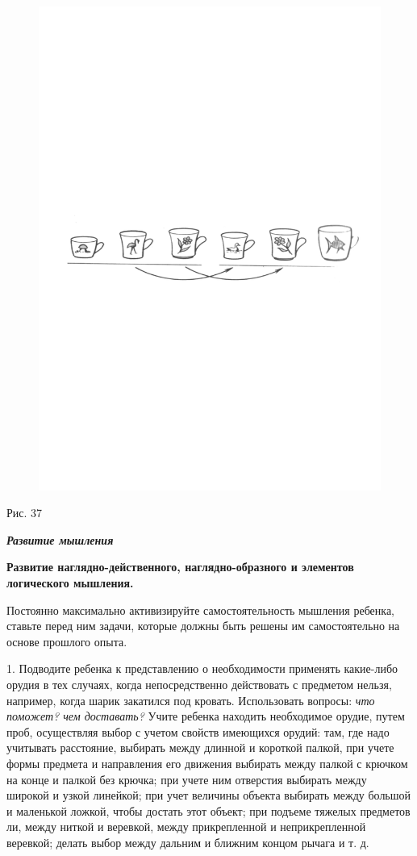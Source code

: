 \documentclass[a5paper]{book}
\renewcommand{\emph}[1]{\textit{#1}}
\begin{document}
\begin{figure}
\centering
\includegraphics[width=\linewidth]{media/media/image34.png}
\end{figure}

Рис. 37

\emph{\textbf{Развитие мышления}}

\textbf{Развитие наглядно-действенного, наглядно-образного и элементов
логического мышления.}

Постоянно максимально активизируйте самостоятельность мышления ребенка,
ставьте перед ним задачи, которые должны быть решены им самостоятельно
на основе прошлого опыта.

1. Подводите ребенка к представлению о необходимости применять
какие-либо орудия в тех случаях, когда непосредственно действовать с
предметом нельзя, например, когда шарик закатился под кровать.
Использовать вопросы: \emph{что поможет? чем доставать?} Учите ребенка
находить необходимое орудие, путем проб, осуществляя выбор с учетом
свойств имеющихся орудий: там, где надо учитывать расстояние, выбирать
между длинной и короткой палкой, при учете формы предмета и направления
его движения выбирать между палкой с крючком на конце и палкой без
крючка; при учете ним отверстия выбирать между широкой и узкой линейкой;
при учет величины объекта выбирать между большой и маленькой ложкой,
чтобы достать этот объект; при подъеме тяжелых предметов ли, между
ниткой и веревкой, между прикрепленной и неприкрепленной веревкой;
делать выбор между дальним и ближним концом рычага и т. д.
\end{document}
